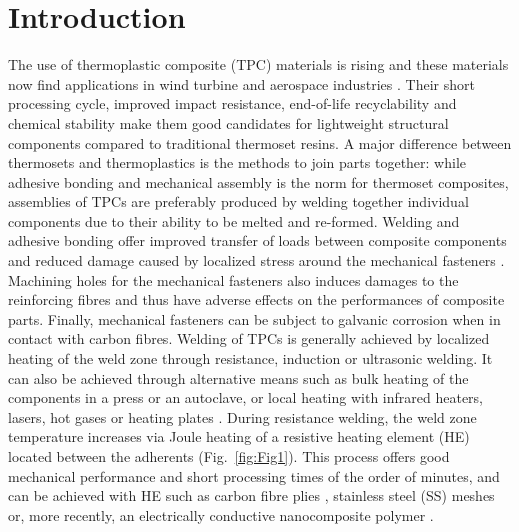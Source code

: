 \documentclass[review,times,sagev,doublespace]{sagej}
\begin{document}
\section{Introduction}

The use of thermoplastic composite (TPC) materials is rising \cite{Mathijsen2016} and these materials now find applications in wind turbine and aerospace industries \cite{Penumadu2019}. 
Their short processing cycle, improved impact resistance, end-of-life recyclability and chemical stability \cite{cogswell1992} make them good candidates for lightweight structural components compared to traditional thermoset resins.  
A major difference between thermosets and thermoplastics is the methods to join parts together: while adhesive bonding and mechanical assembly is the norm for thermoset composites, assemblies of TPCs are preferably produced by welding together individual components {due to their ability to be melted and re-formed}. 
{
Welding and adhesive bonding offer improved transfer of loads between composite components and reduced damage caused by localized stress around the mechanical fasteners \cite{Hou1992}. 
Machining holes for the mechanical fasteners also induces damages to the reinforcing fibres and thus have adverse effects on the performances of composite parts. 
Finally, mechanical fasteners can be subject to galvanic corrosion when in contact with carbon fibres.
Welding of TPCs is generally} achieved by localized heating of the weld zone through resistance, induction or ultrasonic welding.
{
It can also be achieved through alternative means such as bulk heating of the components in a press or an autoclave, or local heating with infrared heaters, lasers, hot gases or heating plates \cite{Ageorges2001a}. 
}
During resistance welding, the weld zone temperature increases via {J}oule heating of a resistive heating element (HE) located between the adherents \cite{Ageorges2001a,Stavrov2005a,Dube2007c,Shi2014,Brassard2019a,Eveno1988} (Fig.~\ref{fig:Fig1}). 
This process offers good mechanical performance and short processing times of the order of minutes, and can be achieved with HE such as carbon fibre plies \cite{Eveno1988}, stainless steel (SS) meshes \cite{Stavrov2005a,Dube2007c,Shi2014} or, more recently, an electrically conductive nanocomposite polymer \cite{Brassard2019a}. 
\end{document}
